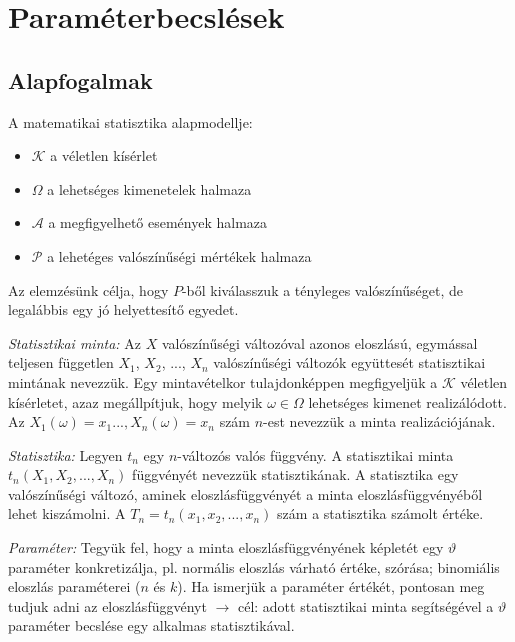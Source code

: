 \chapter{Paraméterbecslések}

\section{Alapfogalmak}

A matematikai statisztika alapmodellje:
\begin{itemize}
\item $\mathcal{K}$ a véletlen kísérlet
\item $\Omega$ a lehetséges kimenetelek halmaza
\item $\mathcal{A}$ a megfigyelhető események halmaza
\item $\mathcal{P}$ a lehetéges valószínűségi mértékek halmaza
\end{itemize}
Az elemzésünk célja, hogy $\mathit{P}$-ből kiválasszuk a tényleges valószínűséget, de legalábbis egy jó helyettesítő egyedet.

\emph{Statisztikai minta:} Az $X$ valószínűségi változóval azonos eloszlású, egymással teljesen független $X_1$, $X_2$, ..., $X_n$ valószínűségi változók együttesét statisztikai mintának nevezzük. Egy mintavételkor tulajdonképpen megfigyeljük a $\mathcal{K}$ véletlen kísérletet, azaz megállpítjuk, hogy melyik $\omega \in \Omega$ lehetséges kimenet realizálódott. Az $X_1(\omega)=x_1..., X_n(\omega)=x_n$ szám $n$-est nevezzük a minta realizációjának.

\emph{Statisztika:} Legyen $t_n$ egy $n$-változós valós függvény. A statisztikai minta $t_n(X_1, X_2, ..., X_n)$ függvényét nevezzük statisztikának. A statisztika egy valószínűségi változó, aminek eloszlásfüggvényét a minta eloszlásfüggvényéből lehet kiszámolni. A $T_n = t_n(x_1, x_2, ..., x_n)$ szám a statisztika számolt értéke.

\emph{Paraméter:} Tegyük fel, hogy a minta eloszlásfüggvényének képletét egy $\vartheta$ paraméter konkretizálja, pl. normális eloszlás várható értéke, szórása; binomiális eloszlás paraméterei ($n$ és $k$). Ha ismerjük a paraméter értékét, pontosan meg tudjuk adni az eloszlásfüggvényt $\rightarrow$ cél: adott statisztikai minta segítségével a $\vartheta$ paraméter becslése egy alkalmas statisztikával.

